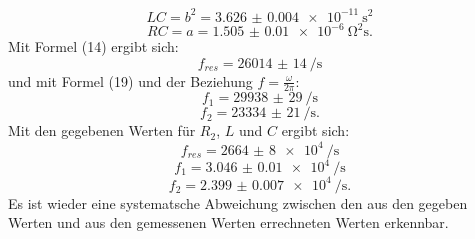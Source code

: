 \begin{displaymath}
LC = b^2 = \SI{3.626(4)e-11}{\second\squared}
\end{displaymath}
\begin{displaymath}
RC = a = \SI{1.505(10)e-6}{\ohm\squared\second}\text{.}
\end{displaymath}
Mit Formel (14) ergibt sich:
\begin{displaymath}
f_{res} = \SI{26014(14)}{\per\second}
\end{displaymath}
und mit Formel (19) und der Beziehung $f = \frac{\omega}{2\pi}$:
\begin{displaymath}
f_1 = \SI{29938(29)}{\per\second}
\end{displaymath}
\begin{displaymath}
f_2 = \SI{23334(21)}{\per\second}\text{.}
\end{displaymath}
Mit den gegebenen Werten für $R_2$, $L$ und $C$ ergibt sich:
\begin{displaymath}
f_{res} = \SI{2664(8)e4}{\per\second}
\end{displaymath}
\begin{displaymath}
f_1 = \SI{3.046(10)e4}{\per\second}
\end{displaymath}
\begin{displaymath}
f_2 = \SI{2.399(7)e4}{\per\second}\text{.}
\end{displaymath}
Es ist wieder eine systematsche Abweichung zwischen den aus den gegeben Werten und aus den gemessenen Werten errechneten Werten erkennbar.
